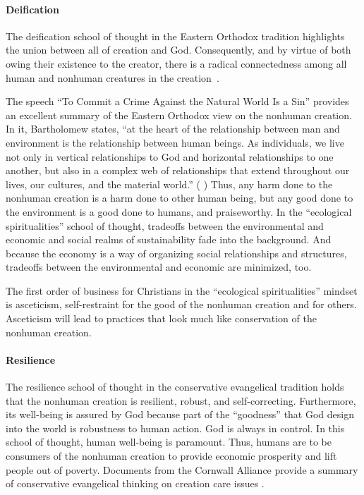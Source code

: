 \documentclass[12pt]{article}
\begin{document}
\paragraph{Deification} 
\label{sec:deification}

The deification school of thought in the Eastern Orthodox tradition
highlights the union between all of creation and God.
Consequently, and by virtue of both owing their existence to the creator,
there is a radical connectedness among all human and nonhuman creatures 
in the creation~\autocite[93]{Jenkins:2008}.

The speech ``To Commit a Crime Against the Natural World Is a Sin'' 
\autocite[133-136]{Bartholomew-I-of-Constantinople:2011aa}
provides an excellent summary of the Eastern Orthodox view
on the nonhuman creation.
In it, Bartholomew states,
``at the heart of the relationship between man and environment 
is the relationship between human beings.
As individuals, we live not only in vertical relationships to God 
and horizontal relationships to one another, but 
also in a complex web of relationships that extend throughout
our lives, our cultures, and the material world.''
(\textcite{Bartholomew-I-of-Constantinople:2011aa} 
\textcite[133--134]{Bartholomew-I-of-Constantinople:2011aa})
Thus, any harm done to the nonhuman creation is a harm done to other human being, but
any good done to the environment is a good done to humans, 
and praiseworthy. 
In the ``ecological spiritualities'' school of thought, 
tradeoffs between the environmental and economic and social realms of sustainability
fade into the background. 
And because the economy is a way of organizing social relationships and structures,
tradeoffs between the environmental and economic are minimized, too.

The first order of business for Christians in the ``ecological spiritualities'' mindset 
is asceticism, self-restraint for the good of the nonhuman creation and for others.
Asceticism will lead to practices that look much like conservation of the nonhuman creation.




\paragraph{Resilience} 
\label{sec:resilience}

The resilience school of thought in the conservative evangelical tradition
holds that the nonhuman creation is resilient, robust, and self-correcting.
Furthermore, its well-being is assured by God because part of the ``goodness'' that God design into the world is robustness to human action.
God is always in control.
In this school of thought, human well-being is paramount. 
Thus, humans are to be consumers of the nonhuman creation 
to provide economic prosperity and
lift people out of poverty.
Documents from the Cornwall Alliance 
provide a summary of conservative evangelical thinking on creation care issues
\autocite{Cornwall:2006aa}.
\end{document}
